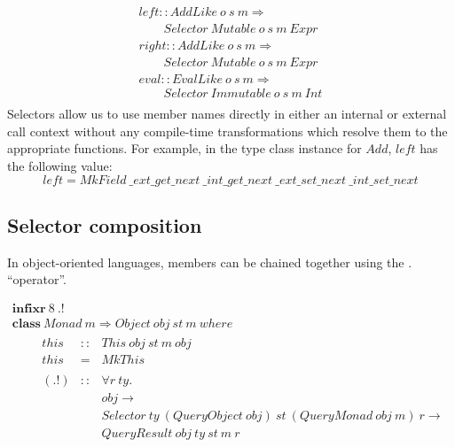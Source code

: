 \begin{displaymath}
\begin{array}{l}
\mathit{left} :: \mathit{AddLike}~o~s~m \Rightarrow \\
\qquad \mathit{Selector}~\mathit{Mutable}~o~s~m~\mathit{Expr} \\
\mathit{right} :: \mathit{AddLike}~o~s~m \Rightarrow \\
\qquad \mathit{Selector}~\mathit{Mutable}~o~s~m~\mathit{Expr} \\
\mathit{eval} :: \mathit{EvalLike}~o~s~m \Rightarrow \\
\qquad \mathit{Selector}~\mathit{Immutable}~o~s~m~\mathit{Int} \\
\end{array}
\end{displaymath}
Selectors allow us to use member names directly in either an internal or external call context without any compile-time transformations which resolve them to the appropriate functions. For example, in the type class instance for $\mathit{Add}$, $\mathit{left}$ has the following value:
\begin{displaymath}
\mathit{left} = \mathit{MkField}~\mathit{\_ext\_get\_next}~\mathit{\_int\_get\_next}~\mathit{\_ext\_set\_next}~\mathit{\_int\_set\_next}
\end{displaymath}

\subsection{Selector composition}

In object-oriented languages, members can be chained together using the $.$ ``operator''.

\begin{displaymath}
\begin{array}{l}
\mathbf{infixr}~8~.!\\
\mathbf{class}~\mathit{Monad}~m \Rightarrow \mathit{Object}~\mathit{obj}~\mathit{st}~m~\mathit{where} \\
\qquad \begin{array}{lcl}
\mathit{this} & :: & \mathit{This}~\mathit{obj}~\mathit{st}~\mathit{m}~\mathit{obj} \\
\mathit{this} & = & \mathit{MkThis} \\\\

(.!) & :: & \forall r~\mathit{ty}.\\ 
     &    & \mathit{obj} \to \\
     &    & \mathit{Selector}~\mathit{ty}~(\mathit{QueryObject}~\mathit{obj})~\mathit{st}~(\mathit{QueryMonad}~\mathit{obj}~\mathit{m})~r \to  \\
     &    & \mathit{QueryResult}~\mathit{obj}~\mathit{ty}~\mathit{st}~m~r
\end{array}
\end{array}
\end{displaymath}

